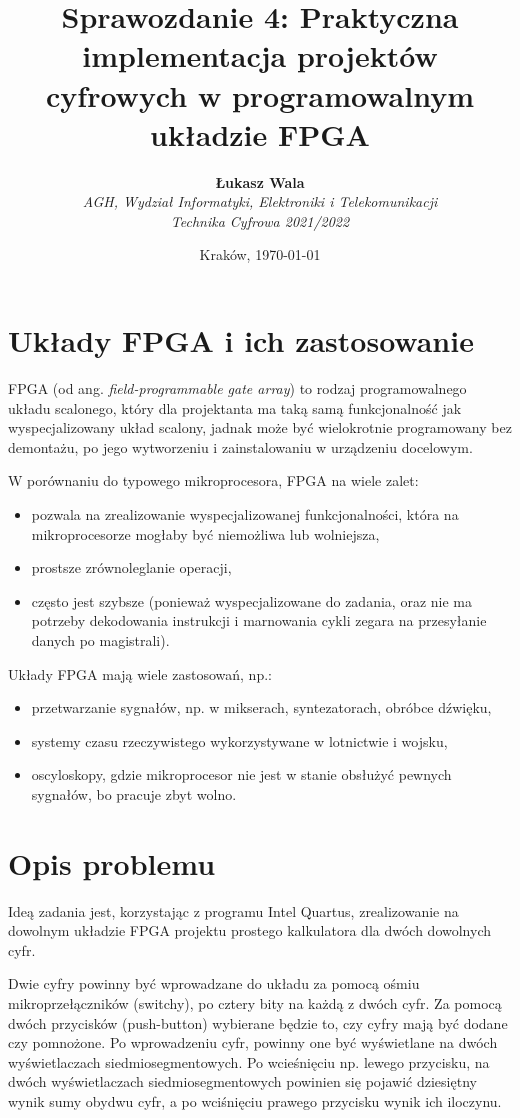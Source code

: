 \documentclass{article}
\title{Sprawozdanie 4: Praktyczna implementacja projektów cyfrowych w programowalnym układzie FPGA}
\author{\textbf{Łukasz Wala} \\
    \textit{AGH, Wydział Informatyki, Elektroniki i Telekomunikacji} \\
    \textit{Technika Cyfrowa 2021/2022}}
\date{Kraków, \today}
\begin{document}
\maketitle

\section{Układy FPGA i ich zastosowanie}
FPGA (od ang. \textit{field-programmable gate array}) to rodzaj programowalnego układu scalonego, który dla projektanta
ma taką samą funkcjonalność jak wyspecjalizowany układ scalony, jadnak może być wielokrotnie programowany bez demontażu,
po jego wytworzeniu i zainstalowaniu w urządzeniu docelowym.

W porównaniu do typowego mikroprocesora, FPGA na wiele zalet:
\begin{itemize}
    \item
    pozwala na zrealizowanie wyspecjalizowanej funkcjonalności, która na mikroprocesorze mogłaby być niemożliwa lub 
    wolniejsza,
    \item 
    prostsze zrównoleglanie operacji,
    \item
    często jest szybsze (ponieważ wyspecjalizowane do zadania, oraz nie ma potrzeby dekodowania instrukcji i 
    marnowania cykli zegara na przesyłanie danych po magistrali).
\end{itemize}

Układy FPGA mają wiele zastosowań, np.:
\begin{itemize}
    \item
    przetwarzanie sygnałów, np. w mikserach, syntezatorach, obróbce dźwięku,
    \item 
    systemy czasu rzeczywistego wykorzystywane w lotnictwie i wojsku,
    \item
    oscyloskopy, gdzie mikroprocesor nie jest w stanie obsłużyć pewnych sygnałów, bo pracuje zbyt wolno.
\end{itemize}

\section{Opis problemu}
Ideą zadania jest, korzystając z programu Intel Quartus, zrealizowanie na dowolnym układzie FPGA projektu
prostego kalkulatora dla dwóch dowolnych cyfr. 

Dwie cyfry powinny być wprowadzane do układu za pomocą ośmiu
mikroprzełączników (switchy), po cztery bity na każdą z dwóch cyfr. Za pomocą dwóch przycisków (push-button)
wybierane będzie to, czy cyfry mają być dodane czy pomnożone. Po wprowadzeniu cyfr, powinny one być
wyświetlane na dwóch wyświetlaczach siedmiosegmentowych. Po wcieśnięciu np. lewego przycisku, na dwóch
wyświetlaczach siedmiosegmentowych powinien się pojawić dziesiętny wynik sumy obydwu cyfr, a po wciśnięciu
prawego przycisku wynik ich iloczynu.
\end{document}
